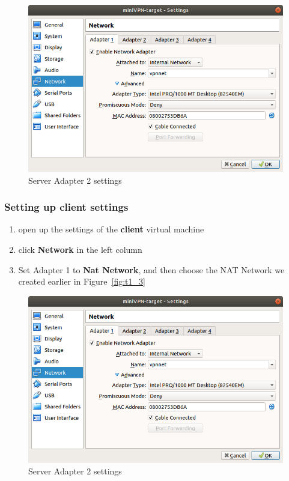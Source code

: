 \documentclass[12pt]{article}
\begin{document}
    \begin{figure}[H]
        \begin{center}
            \includegraphics[scale=0.5]{networking_target.png}
        \end{center}{}
        \caption{Server Adapter 2 settings}
        \label{fig:networking_target}
    \end{figure}

\subsubsection{Setting up client settings}
    \begin{enumerate}
        \item open up the settings of the \textbf{client} virtual machine
        \item click \textbf{Network} in the left column
        \item Set Adapter 1 to \textbf{Nat Network}, and then choose the NAT Network we created earlier in Figure~\ref{fig:t1_3}
    \end{enumerate}
    
    \begin{figure}[H]
        \begin{center}
            \includegraphics[scale=0.5]{networking_target.png}
        \end{center}{}
        \caption{Server Adapter 2 settings}
        \label{fig:networking_target}
    \end{figure}
\end{document}
